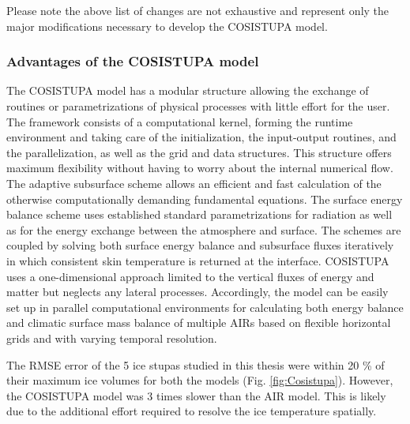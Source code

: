 Please note the above list of changes are not exhaustive and represent only the major modifications necessary to
develop the COSISTUPA model.

\subsubsection{Advantages of the COSISTUPA model}

The COSISTUPA model has a modular structure allowing the exchange of routines or parametrizations of physical
processes with little effort for the user. The framework consists of a computational kernel, forming
the runtime environment and taking care of the initialization, the input-output routines, and the
parallelization, as well as the grid and data structures. This structure offers maximum flexibility without
having to worry about the internal numerical flow. The adaptive subsurface scheme allows an efficient and fast
calculation of the otherwise computationally demanding fundamental equations. The surface energy balance scheme
uses established standard parametrizations for radiation as well as for the energy exchange between the
atmosphere and surface. The schemes are coupled by solving both surface energy balance and subsurface fluxes
iteratively in which consistent skin temperature is returned at the interface. COSISTUPA uses a one-dimensional
approach limited to the vertical fluxes of energy and matter but neglects any lateral processes. Accordingly,
the model can be easily set up in parallel computational environments for calculating both energy balance and
climatic surface mass balance of multiple \ac{AIRs} based on flexible horizontal grids and with varying temporal
resolution.

The RMSE error of the 5 ice stupas studied in this thesis were within 20 \% of their maximum ice volumes for both
the models (Fig. \ref{fig:Cosistupa}).  However, the COSISTUPA model was 3 times slower than the AIR model. This
is likely due to the additional effort required to resolve the ice temperature spatially.

